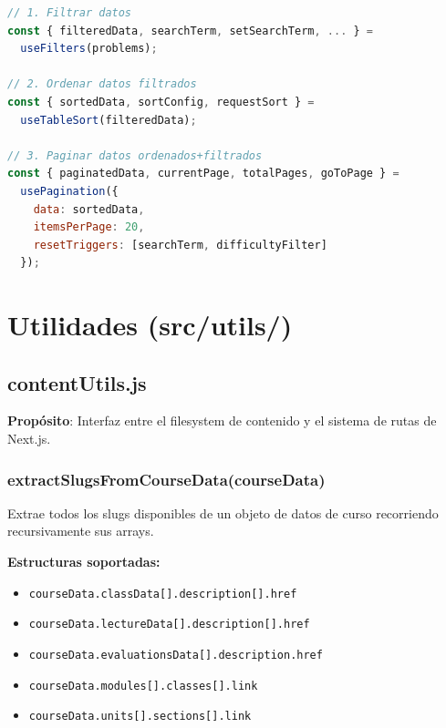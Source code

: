 \documentclass[12pt,a4paper]{article}
\begin{document}
\begin{lstlisting}[language=JavaScript, caption={Patrón de composición típico en ProblemTable.jsx}]
// 1. Filtrar datos
const { filteredData, searchTerm, setSearchTerm, ... } =
  useFilters(problems);

// 2. Ordenar datos filtrados
const { sortedData, sortConfig, requestSort } =
  useTableSort(filteredData);

// 3. Paginar datos ordenados+filtrados
const { paginatedData, currentPage, totalPages, goToPage } =
  usePagination({
    data: sortedData,
    itemsPerPage: 20,
    resetTriggers: [searchTerm, difficultyFilter]
  });
\end{lstlisting}

\section{Utilidades (src/utils/)}

\subsection{contentUtils.js}

\textbf{Propósito}: Interfaz entre el filesystem de contenido y el sistema de rutas de Next.js.

\subsubsection{extractSlugsFromCourseData(courseData)}

Extrae todos los slugs disponibles de un objeto de datos de curso recorriendo recursivamente sus arrays.

\begin{mdframed}[style=infobox]
\textbf{Estructuras soportadas:}
\begin{itemize}[noitemsep]
  \item \texttt{courseData.classData[].description[].href}
  \item \texttt{courseData.lectureData[].description[].href}
  \item \texttt{courseData.evaluationsData[].description.href}
  \item \texttt{courseData.modules[].classes[].link}
  \item \texttt{courseData.units[].sections[].link}
\end{itemize}
\end{mdframed}
\end{document}
